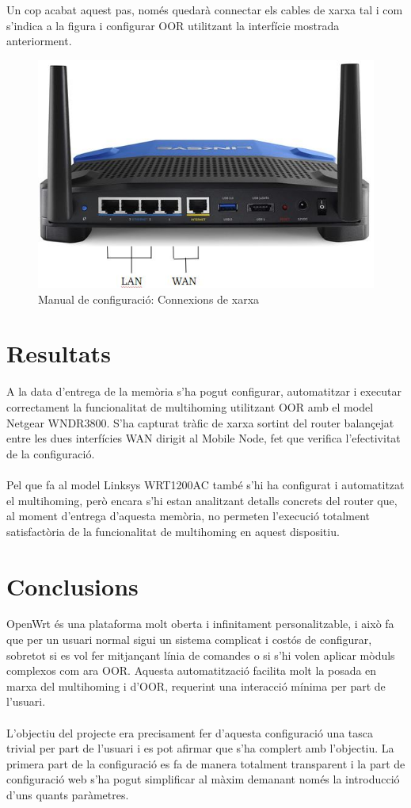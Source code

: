 \documentclass[11pt]{article}
\begin{document}
Un cop acabat aquest pas, només quedarà connectar els cables de xarxa tal i com s'indica a la figura i configurar OOR utilitzant la interfície mostrada anteriorment.	
\begin{figure}[h]
		\centering
		\includegraphics[scale=1]{linksys}
		\caption{Manual de configuració: Connexions de xarxa}
	\end{figure}
	
	
\section{Resultats}
A la data d’entrega de la memòria s’ha pogut configurar, automatitzar i executar correctament la funcionalitat de multihoming utilitzant OOR amb el model Netgear WNDR3800. S’ha capturat tràfic de xarxa sortint del router balançejat entre les dues interfícies WAN dirigit al Mobile Node, fet que verifica l’efectivitat de la configuració.\\
\\
Pel que fa al model Linksys WRT1200AC també s’hi ha configurat i automatitzat el multihoming, però encara s’hi estan analitzant detalls concrets del router que, al moment d’entrega d’aquesta memòria, no permeten l’execució totalment satisfactòria de la funcionalitat de multihoming en aquest dispositiu.

\section{Conclusions}
OpenWrt és una plataforma molt oberta i infinitament personalitzable, i això fa que per un usuari normal sigui un sistema complicat i costós de configurar, sobretot si es vol fer mitjançant línia de comandes o si s’hi volen aplicar mòduls complexos com ara OOR. Aquesta automatització facilita molt la posada en marxa del multihoming i d’OOR, requerint una interacció mínima per part de l’usuari.\\
\\
L'objectiu del projecte era precisament fer d'aquesta configuració una tasca trivial per part de l'usuari i es pot afirmar que s'ha complert amb l'objectiu. La primera part de la configuració es fa de manera totalment transparent i la part de configuració web s'ha pogut simplificar al màxim demanant només la introducció d'uns quants paràmetres.\\
\end{document}
